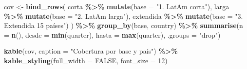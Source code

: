 \documentclass[
]{article}
\newenvironment{Shaded}{\begin{snugshade}}{\end{snugshade}}
\newcommand{\AttributeTok}[1]{\textcolor[rgb]{0.13,0.29,0.53}{#1}}
\newcommand{\ConstantTok}[1]{\textcolor[rgb]{0.56,0.35,0.01}{#1}}
\newcommand{\DecValTok}[1]{\textcolor[rgb]{0.00,0.00,0.81}{#1}}
\newcommand{\FunctionTok}[1]{\textcolor[rgb]{0.13,0.29,0.53}{\textbf{#1}}}
\newcommand{\NormalTok}[1]{#1}
\newcommand{\OtherTok}[1]{\textcolor[rgb]{0.56,0.35,0.01}{#1}}
\newcommand{\SpecialCharTok}[1]{\textcolor[rgb]{0.81,0.36,0.00}{\textbf{#1}}}
\newcommand{\StringTok}[1]{\textcolor[rgb]{0.31,0.60,0.02}{#1}}
\begin{document}
\begin{Shaded}
\begin{Highlighting}[]
\NormalTok{cov }\OtherTok{\textless{}{-}} \FunctionTok{bind\_rows}\NormalTok{(}
\NormalTok{  corta     }\SpecialCharTok{\%\textgreater{}\%} \FunctionTok{mutate}\NormalTok{(}\AttributeTok{base =} \StringTok{"1. LatAm corta"}\NormalTok{),}
\NormalTok{  larga     }\SpecialCharTok{\%\textgreater{}\%} \FunctionTok{mutate}\NormalTok{(}\AttributeTok{base =} \StringTok{"2. LatAm larga"}\NormalTok{),}
\NormalTok{  extendida }\SpecialCharTok{\%\textgreater{}\%} \FunctionTok{mutate}\NormalTok{(}\AttributeTok{base =} \StringTok{"3. Extendida 15 países"}\NormalTok{)}
\NormalTok{) }\SpecialCharTok{\%\textgreater{}\%}
  \FunctionTok{group\_by}\NormalTok{(base, country) }\SpecialCharTok{\%\textgreater{}\%}
  \FunctionTok{summarise}\NormalTok{(}\AttributeTok{n =} \FunctionTok{n}\NormalTok{(), }\AttributeTok{desde =} \FunctionTok{min}\NormalTok{(quarter), }\AttributeTok{hasta =} \FunctionTok{max}\NormalTok{(quarter), }\AttributeTok{.groups =} \StringTok{"drop"}\NormalTok{)}

\FunctionTok{kable}\NormalTok{(cov, }\AttributeTok{caption =} \StringTok{"Cobertura por base y país"}\NormalTok{) }\SpecialCharTok{\%\textgreater{}\%}
  \FunctionTok{kable\_styling}\NormalTok{(}\AttributeTok{full\_width =} \ConstantTok{FALSE}\NormalTok{, }\AttributeTok{font\_size =} \DecValTok{12}\NormalTok{)}
\end{Highlighting}
\end{Shaded}

\begingroup\fontsize{12}{14}\selectfont
\end{document}

